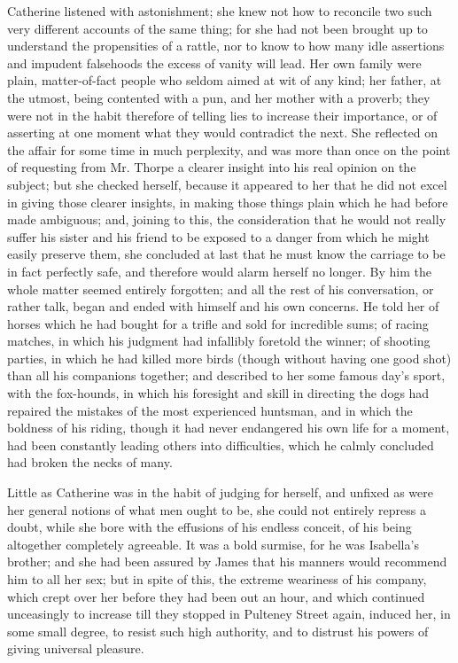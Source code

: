 Catherine listened with astonishment; she knew not how to reconcile two such very different accounts of the same thing; for she had not been brought up to understand the propensities of a rattle, nor to know to how many idle assertions and impudent falsehoods the excess of vanity will lead. Her own family were plain, matter-of-fact people who seldom aimed at wit of any kind; her father, at the utmost, being contented with a pun, and her mother with a proverb; they were not in the habit therefore of telling lies to increase their importance, or of asserting at one moment what they would contradict the next. She reflected on the affair for some time in much perplexity, and was more than once on the point of requesting from Mr. Thorpe a clearer insight into his real opinion on the subject; but she checked herself, because it appeared to her that he did not excel in giving those clearer insights, in making those things plain which he had before made ambiguous; and, joining to this, the consideration that he would not really suffer his sister and his friend to be exposed to a danger from which he might easily preserve them, she concluded at last that he must know the carriage to be in fact perfectly safe, and therefore would alarm herself no longer. By him the whole matter seemed entirely forgotten; and all the rest of his conversation, or rather talk, began and ended with himself and his own concerns. He told her of horses which he had bought for a trifle and sold for incredible sums; of racing matches, in which his judgment had infallibly foretold the winner; of shooting parties, in which he had killed more birds (though without having one good shot) than all his companions together; and described to her some famous day's sport, with the fox-hounds, in which his foresight and skill in directing the dogs had repaired the mistakes of the most experienced huntsman, and in which the boldness of his riding, though it had never endangered his own life for a moment, had been constantly leading others into difficulties, which he calmly concluded had broken the necks of many.

Little as Catherine was in the habit of judging for herself, and unfixed as were her general notions of what men ought to be, she could not entirely repress a doubt, while she bore with the effusions of his endless conceit, of his being altogether completely agreeable. It was a bold surmise, for he was Isabella's brother; and she had been assured by James that his manners would recommend him to all her sex; but in spite of this, the extreme weariness of his company, which crept over her before they had been out an hour, and which continued unceasingly to increase till they stopped in Pulteney Street again, induced her, in some small degree, to resist such high authority, and to distrust his powers of giving universal pleasure.

